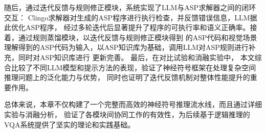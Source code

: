 随后，通过迭代反馈与规则修正模块，系统实现了LLM与ASP求解器之间的闭环交互：
Clingo求解器对生成的ASP程序进行执行检查，并反馈错误信息，LLM据此优化ASP程序，
经过多轮迭代后显著提升了程序的可执行率和语义正确率。接着，通过规则蒸馏模块，以迭代反馈与规则修正模块得到
的ASP代码和视觉场景理解得到的ASP代码为输入，以ASP知识库为基础，调用LLM对ASP规则进行补充，同时对ASP知识库进行
更新完善。
最后，在对比试验和消融实验中，
本文综合比较了不同LLM模型和提示方法的表现，验证了神经符号框架在处理复杂空间推理问题上的泛化能力与优势，
同时也证明了迭代反馈机制对整体性能提升的重要作用。

总体来说，本章不仅构建了一个完整而高效的神经符号推理流水线，而且通过详细实验与消融分析，
验证了各模块间协同工作的有效性，为后续基于逻辑推理的VQA系统提供了坚实的理论和实践基础。